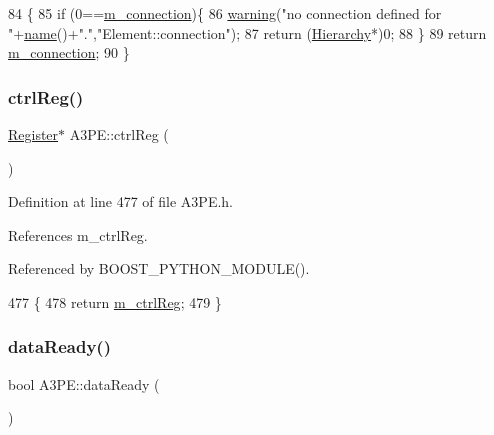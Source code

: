 \begin{DoxyCode}
84                               \{
85   \textcolor{keywordflow}{if} (0==\hyperlink{classElement_abe3de7a5dbbc9a6dd2d7e012e5fdb266}{m\_connection})\{
86     \hyperlink{classObject_a65cd4fda577711660821fd2cd5a3b4c9}{warning}(\textcolor{stringliteral}{"no connection defined for "}+\hyperlink{classObject_a300f4c05dd468c7bb8b3c968868443c1}{name}()+\textcolor{stringliteral}{"."},\textcolor{stringliteral}{"Element::connection"});
87     \textcolor{keywordflow}{return} (\hyperlink{classHierarchy}{Hierarchy}*)0;
88   \}
89   \textcolor{keywordflow}{return} \hyperlink{classElement_abe3de7a5dbbc9a6dd2d7e012e5fdb266}{m\_connection};
90 \}
\end{DoxyCode}
\mbox{\label{classA3PE_ae5fc5dac92af2b34a41be388586647be}} 
\subsubsection{\texorpdfstring{ctrl\+Reg()}{ctrlReg()}}
{\footnotesize\ttfamily \hyperlink{classRegister}{Register}$\ast$ A3\+P\+E\+::ctrl\+Reg (\begin{DoxyParamCaption}{ }\end{DoxyParamCaption})\hspace{0.3cm}{\ttfamily [inline]}}



Definition at line 477 of file A3\+P\+E.\+h.



References m\+\_\+ctrl\+Reg.



Referenced by B\+O\+O\+S\+T\+\_\+\+P\+Y\+T\+H\+O\+N\+\_\+\+M\+O\+D\+U\+L\+E().


\begin{DoxyCode}
477                      \{
478     \textcolor{keywordflow}{return} \hyperlink{classA3PE_a264834484dd6326ebad58c2a3e1be9a6}{m\_ctrlReg};
479   \}
\end{DoxyCode}
\mbox{\label{classA3PE_a55df064c578bbc1e80a3b5fc05933f27}} 
\subsubsection{\texorpdfstring{data\+Ready()}{dataReady()}}
{\footnotesize\ttfamily bool A3\+P\+E\+::data\+Ready (\begin{DoxyParamCaption}{ }\end{DoxyParamCaption})}



